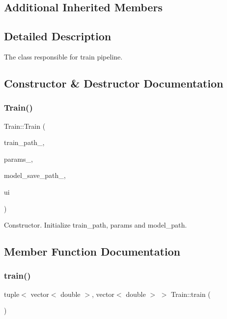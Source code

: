 \subsection*{Additional Inherited Members}


\subsection{Detailed Description}
The class responsible for train pipeline. 

\subsection{Constructor \& Destructor Documentation}
\mbox{\label{classTrain_a4b75a671b226dea5fb805ae78861bf57}} 
\subsubsection{\texorpdfstring{Train()}{Train()}}
{\footnotesize\ttfamily Train\+::\+Train (\begin{DoxyParamCaption}\item[{string}]{train\+\_\+path\+\_\+,  }\item[{const \hyperlink{structTrainParameters}{Train\+Parameters} \&}]{params\+\_\+,  }\item[{string}]{model\+\_\+save\+\_\+path\+\_\+,  }\item[{\hyperlink{classUi__Train__Window}{Ui\+\_\+\+Train\+\_\+\+Window} $\ast$}]{ui }\end{DoxyParamCaption})\hspace{0.3cm}{\ttfamily [explicit]}}

Constructor. Initialize train\+\_\+path, params and model\+\_\+path. 

\subsection{Member Function Documentation}
\mbox{\label{classTrain_af7a62fd09c8ea99ca0dac16cc5d1742f}} 
\subsubsection{\texorpdfstring{train()}{train()}}
{\footnotesize\ttfamily tuple$<$ vector$<$ double $>$, vector$<$ double $>$ $>$ Train\+::train (\begin{DoxyParamCaption}{ }\end{DoxyParamCaption})\hspace{0.3cm}{\ttfamily [virtual]}}


